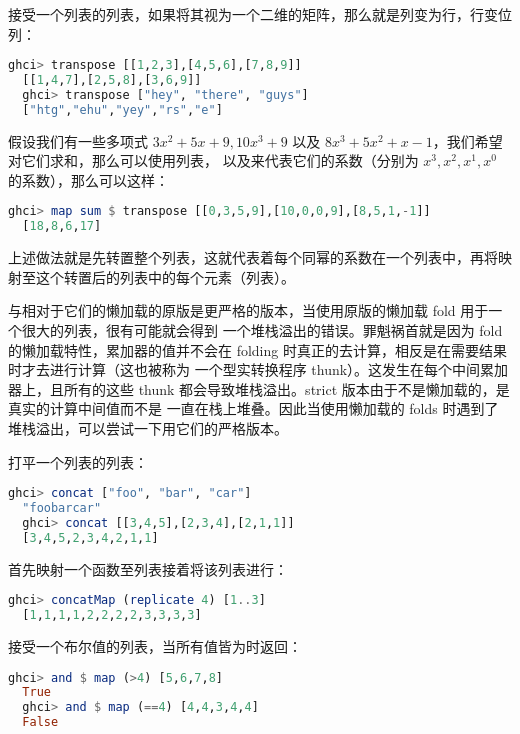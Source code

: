 \documentclass[./main.tex]{subfiles}
\begin{document}
接受一个列表的列表，如果将其视为一个二维的矩阵，那么就是列变为行，行变位列：

\begin{lstlisting}[language=Haskell]
  ghci> transpose [[1,2,3],[4,5,6],[7,8,9]]
  [[1,4,7],[2,5,8],[3,6,9]]
  ghci> transpose ["hey", "there", "guys"]
  ["htg","ehu","yey","rs","e"]
\end{lstlisting}

假设我们有一些多项式 $3x^2 + 5x + 9, 10x^3 + 9$ 以及 $ 8x^3 + 5x^2 + x - 1$，我们希望对它们求和，那么可以使用列表\acode{[0,3,5,9]}，
\acode{[10,0,0,9]}以及\acode{[8,5,1,-1]}来代表它们的系数（分别为 $x^3,x^2,x^1,x^0$ 的系数），那么可以这样：

\begin{lstlisting}[language=Haskell]
  ghci> map sum $ transpose [[0,3,5,9],[10,0,0,9],[8,5,1,-1]]
  [18,8,6,17]
\end{lstlisting}

上述做法就是先转置整个列表，这就代表着每个同幂的系数在一个列表中，再将映射至这个转置后的列表中的每个元素（列表）。

与相对于它们的懒加载的原版是更严格的版本，当使用原版的懒加载 fold 用于一个很大的列表，很有可能就会得到
一个堆栈溢出的错误。罪魁祸首就是因为 fold 的懒加载特性，累加器的值并不会在 folding 时真正的去计算，相反是在需要结果时才去进行计算（这也被称为
一个型实转换程序 thunk）。这发生在每个中间累加器上，且所有的这些 thunk 都会导致堆栈溢出。strict 版本由于不是懒加载的，是真实的计算中间值而不是
一直在栈上堆叠。因此当使用懒加载的 folds 时遇到了堆栈溢出，可以尝试一下用它们的严格版本。

打平一个列表的列表：

\begin{lstlisting}[language=Haskell]
  ghci> concat ["foo", "bar", "car"]
  "foobarcar"
  ghci> concat [[3,4,5],[2,3,4],[2,1,1]]
  [3,4,5,2,3,4,2,1,1]
\end{lstlisting}

首先映射一个函数至列表接着将该列表进行：

\begin{lstlisting}[language=Haskell]
  ghci> concatMap (replicate 4) [1..3]
  [1,1,1,1,2,2,2,2,3,3,3,3]
\end{lstlisting}

接受一个布尔值的列表，当所有值皆为时返回：

\begin{lstlisting}[language=Haskell]
  ghci> and $ map (>4) [5,6,7,8]
  True
  ghci> and $ map (==4) [4,4,3,4,4]
  False
\end{lstlisting}
\end{document}
